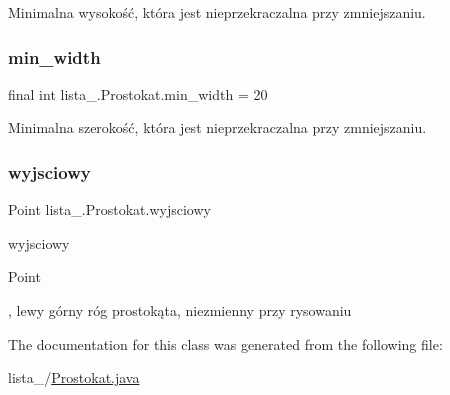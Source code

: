 Minimalna wysokość, która jest nieprzekraczalna przy zmniejszaniu. \mbox{\label{classlista__5_1_1_prostokat_a091fff7a1557fe594f834863d888be0c}} 
\subsubsection{\texorpdfstring{min\+\_\+width}{min\_width}}
{\footnotesize\ttfamily final int lista\+\_.\+Prostokat.\+min\+\_\+width = 20\hspace{0.3cm}{\ttfamily [private]}}

Minimalna szerokość, która jest nieprzekraczalna przy zmniejszaniu. \mbox{\label{classlista__5_1_1_prostokat_adde334d6e8c665362e02745b04bec40d}} 
\subsubsection{\texorpdfstring{wyjsciowy}{wyjsciowy}}
{\footnotesize\ttfamily Point lista\+\_.\+Prostokat.\+wyjsciowy\hspace{0.3cm}{\ttfamily [private]}}

wyjsciowy
\begin{DoxyCode}
Point 
\end{DoxyCode}
 , lewy górny róg prostokąta, niezmienny przy rysowaniu 

The documentation for this class was generated from the following file\+:\begin{DoxyCompactItemize}
\item 
lista\+\_/\mbox{\hyperlink{_prostokat_8java}{Prostokat.\+java}}\end{DoxyCompactItemize}
